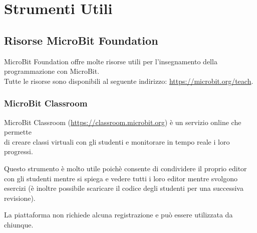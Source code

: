\documentclass[../../docenti.tex]{subfiles}
\begin{document}
\section{Strumenti Utili}

\subsection{Risorse MicroBit Foundation}
MicroBit Foundation offre molte risorse utili per l'insegnamento della programmazione con MicroBit.\\
Tutte le risorse sono disponibili al seguente indirizzo: \url{https://microbit.org/teach}.

\subsubsection{MicroBit Classroom}
MicroBit Classroom (\url{https://classroom.microbit.org}) è un servizio online che permette\\ di creare classi virtuali con gli studenti e monitorare in tempo reale i loro progressi.

Questo strumento è molto utile poichè consente di condividere il proprio editor con gli studenti mentre si spiega e vedere tutti i loro editor mentre svolgono esercizi (è inoltre possibile scaricare il codice degli studenti per una successiva revisione).

La piattaforma non richiede alcuna registrazione e può essere utilizzata da chiunque.
\end{document}
